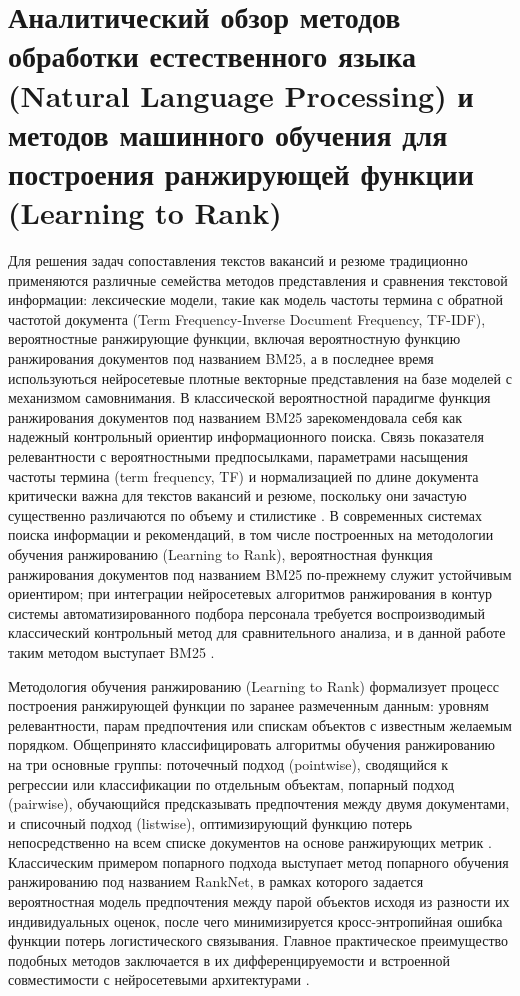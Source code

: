 \section{Аналитический обзор методов обработки естественного языка (Natural Language Processing) и методов машинного обучения для построения ранжирующей функции (Learning to Rank)}
Для решения задач сопоставления текстов вакансий и резюме традиционно применяются различные семейства методов представления и сравнения текстовой информации: лексические модели, такие как модель частоты термина с обратной частотой документа (Term Frequency-Inverse Document Frequency, TF-IDF), вероятностные ранжирующие функции, включая вероятностную функцию ранжирования документов под названием BM25, а в последнее время используються нейросетевые плотные векторные представления на базе моделей с механизмом самовнимания. В классической вероятностной парадигме функция ранжирования документов под названием BM25 зарекомендовала себя как надежный контрольный ориентир информационного поиска. Связь показателя релевантности с вероятностными предпосылками, параметрами насыщения частоты термина (term frequency, TF) и нормализацией по длине документа критически важна для текстов вакансий и резюме, поскольку они зачастую существенно различаются по объему и стилистике \cite{src11}. В современных системах поиска информации и рекомендаций, в том числе построенных на методологии обучения ранжированию (Learning to Rank), вероятностная функция ранжирования документов под названием BM25 по-прежнему служит устойчивым ориентиром; при интеграции нейросетевых алгоритмов ранжирования в контур системы автоматизированного подбора персонала требуется воспроизводимый классический контрольный метод для сравнительного анализа, и в данной работе таким методом выступает BM25 \cite{src08, src11}.\par
Методология обучения ранжированию (Learning to Rank) формализует процесс построения ранжирующей функции по заранее размеченным данным: уровням релевантности, парам предпочтения или спискам объектов с известным желаемым порядком. Общепринято классифицировать алгоритмы обучения ранжированию на три основные группы: поточечный подход (pointwise), сводящийся к регрессии или классификации по отдельным объектам, попарный подход (pairwise), обучающийся предсказывать предпочтения между двумя документами, и списочный подход (listwise), оптимизирующий функцию потерь непосредственно на всем списке документов на основе ранжирующих метрик \cite{src08}. Классическим примером попарного подхода выступает метод попарного обучения ранжированию под названием RankNet, в рамках которого задается вероятностная модель предпочтения между парой объектов исходя из разности их индивидуальных оценок, после чего минимизируется кросс-энтропийная ошибка функции потерь логистического связывания. Главное практическое преимущество подобных методов заключается в их дифференцируемости и встроенной совместимости с нейросетевыми архитектурами \cite{src09}.\par
